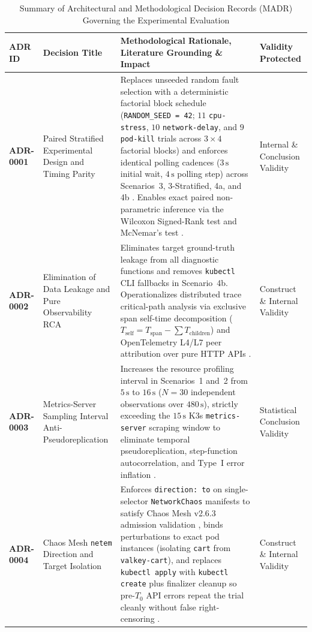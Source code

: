 \begin{table}[htbp]
\centering
\caption{Summary of Architectural and Methodological Decision Records (MADR) Governing the Experimental Evaluation}
\label{tab:madr-summary}
\scriptsize
\renewcommand{\arraystretch}{0.98}
\begin{tabularx}{\textwidth}{|l|p{3.2cm}|X|p{2.6cm}|}
\hline
\textbf{ADR ID} & \textbf{Decision Title} & \textbf{Methodological Rationale, Literature Grounding \& Impact} & \textbf{Validity Protected} \\ \hline
\textbf{ADR-0001} & Paired Stratified Experimental Design and Timing Parity & Replaces unseeded random fault selection with a deterministic factorial block schedule (\texttt{RANDOM\_SEED = 42}; $11$ \texttt{cpu-stress}, $10$ \texttt{network-delay}, and $9$ \texttt{pod-kill} trials across $3 \times 4$ factorial blocks) and enforces identical polling cadences ($3\,\text{s}$ initial wait, $4\,\text{s}$ polling step) across Scenarios~3, 3-Stratified, 4a, and 4b \cite{wohlin_2012}. Enables exact paired non-parametric inference via the Wilcoxon Signed-Rank test \cite{wilcoxon_1945, conover_1999} and McNemar's test \cite{mcnemar_1947}. & Internal \& Conclusion Validity \cite{wohlin_2012} \\ \hline
\textbf{ADR-0002} & Elimination of Data Leakage and Pure Observability RCA & Eliminates target ground-truth leakage \cite{kaufman_2012} from all diagnostic functions and removes \texttt{kubectl} CLI fallbacks in Scenario~4b. Operationalizes distributed trace critical-path analysis \cite{sigelman_2010} via exclusive span self-time decomposition ($T_{\text{self}} = T_{\text{span}} - \sum T_{\text{children}}$) and OpenTelemetry L4/L7 peer attribution over pure HTTP APIs \cite{wang_2024, barata_2026}. & Construct \& Internal Validity \cite{kaufman_2012, verdecchia_2023} \\ \hline
\textbf{ADR-0003} & Metrics-Server Sampling Interval Anti-Pseudoreplication & Increases the resource profiling interval in Scenarios~1 and~2 from $5\,\text{s}$ to $16\,\text{s}$ ($N=30$ independent observations over $480\,\text{s}$), strictly exceeding the $15\,\text{s}$ K3s \texttt{metrics-server} scraping window to eliminate temporal pseudoreplication, step-function autocorrelation, and Type~I error inflation \cite{hurlbert_1984, jain_1991, georges_2007}. & Statistical Conclusion Validity \cite{hurlbert_1984} \\ \hline
\textbf{ADR-0004} & Chaos Mesh \texttt{netem} Direction and Target Isolation & Enforces \texttt{direction: to} on single-selector \texttt{NetworkChaos} manifests to satisfy Chaos Mesh v2.6.3 admission validation \cite{basiri_2016}, binds perturbations to exact pod instances (isolating \texttt{cart} from \texttt{valkey-cart}), and replaces \texttt{kubectl apply} with \texttt{kubectl create} plus finalizer cleanup so pre-$T_0$ API errors repeat the trial cleanly without false right-censoring \cite{sjoberg_2007}. & Construct \& Internal Validity \cite{basiri_2016, sjoberg_2007} \\ \hline

\end{tabularx}
\end{table}
